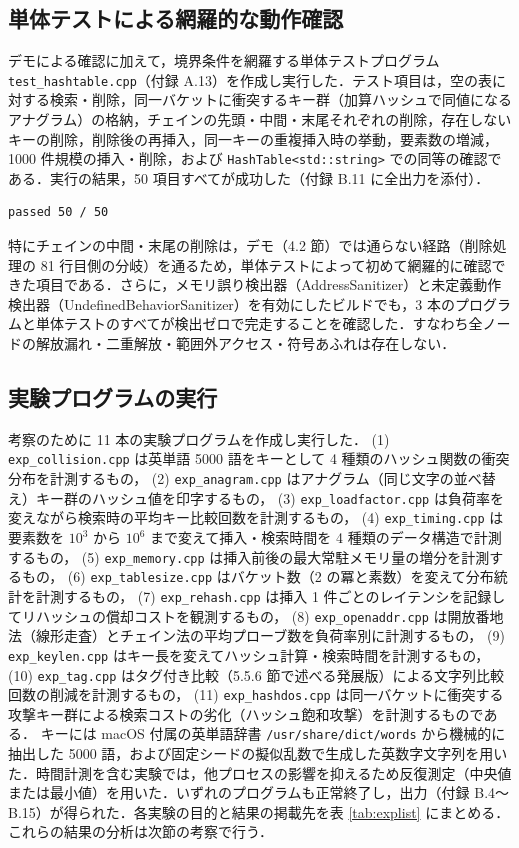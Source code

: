 \subsection{単体テストによる網羅的な動作確認}

デモによる確認に加えて，境界条件を網羅する単体テストプログラム {\tt test\_hashtable.cpp}（付録 A.13）を作成し実行した．テスト項目は，空の表に対する検索・削除，同一バケットに衝突するキー群（加算ハッシュで同値になるアナグラム）の格納，チェインの先頭・中間・末尾それぞれの削除，存在しないキーの削除，削除後の再挿入，同一キーの重複挿入時の挙動，要素数の増減，1000 件規模の挿入・削除，および {\tt HashTable<std::string>} での同等の確認である．実行の結果，50 項目すべてが成功した（付録 B.11 に全出力を添付）．

\begin{verbatim}
passed 50 / 50
\end{verbatim}

特にチェインの中間・末尾の削除は，デモ（4.2 節）では通らない経路（削除処理の 81 行目側の分岐）を通るため，単体テストによって初めて網羅的に確認できた項目である．さらに，メモリ誤り検出器（AddressSanitizer）と未定義動作検出器（UndefinedBehaviorSanitizer）を有効にしたビルドでも，3 本のプログラムと単体テストのすべてが検出ゼロで完走することを確認した．すなわち全ノードの解放漏れ・二重解放・範囲外アクセス・符号あふれは存在しない．

\subsection{実験プログラムの実行}

考察のために 11 本の実験プログラムを作成し実行した．
(1) {\tt exp\_collision.cpp} は英単語 5000 語をキーとして 4 種類のハッシュ関数の衝突分布を計測するもの，
(2) {\tt exp\_anagram.cpp} はアナグラム（同じ文字の並べ替え）キー群のハッシュ値を印字するもの，
(3) {\tt exp\_loadfactor.cpp} は負荷率を変えながら検索時の平均キー比較回数を計測するもの，
(4) {\tt exp\_timing.cpp} は要素数を $10^3$ から $10^6$ まで変えて挿入・検索時間を 4 種類のデータ構造で計測するもの，
(5) {\tt exp\_memory.cpp} は挿入前後の最大常駐メモリ量の増分を計測するもの，
(6) {\tt exp\_tablesize.cpp} はバケット数（2 の冪と素数）を変えて分布統計を計測するもの，
(7) {\tt exp\_rehash.cpp} は挿入 1 件ごとのレイテンシを記録してリハッシュの償却コストを観測するもの，
(8) {\tt exp\_openaddr.cpp} は開放番地法（線形走査）とチェイン法の平均プローブ数を負荷率別に計測するもの，
(9) {\tt exp\_keylen.cpp} はキー長を変えてハッシュ計算・検索時間を計測するもの，
(10) {\tt exp\_tag.cpp} はタグ付き比較（5.5.6 節で述べる発展版）による文字列比較回数の削減を計測するもの，
(11) {\tt exp\_hashdos.cpp} は同一バケットに衝突する攻撃キー群による検索コストの劣化（ハッシュ飽和攻撃）を計測するものである．
キーには macOS 付属の英単語辞書 {\tt /usr/share/dict/words} から機械的に抽出した 5000 語，および固定シードの擬似乱数で生成した英数字文字列を用いた．時間計測を含む実験では，他プロセスの影響を抑えるため反復測定（中央値または最小値）を用いた．いずれのプログラムも正常終了し，出力（付録 B.4〜B.15）が得られた．各実験の目的と結果の掲載先を表 \ref{tab:explist} にまとめる．これらの結果の分析は次節の考察で行う．

